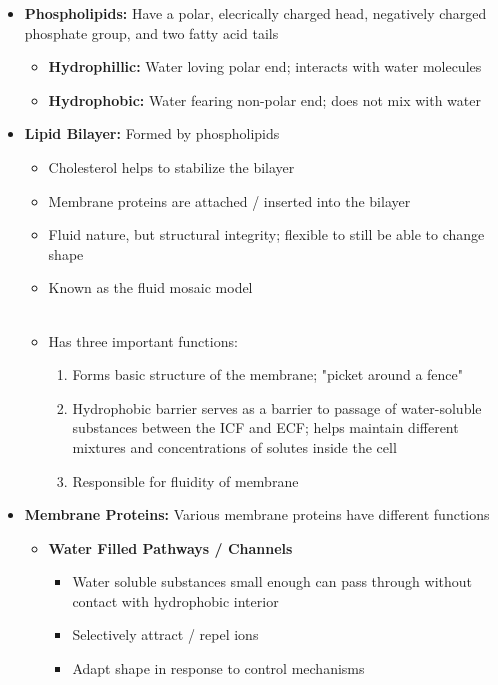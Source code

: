 \documentclass[11pt]{article}
\begin{document}
\begin{itemize}

\item \textbf{Phospholipids:} Have a polar, elecrically charged head, negatively charged phosphate group, and two fatty acid tails
\begin{itemize}
\item \textbf{Hydrophillic: }Water loving polar end; interacts with water molecules
\item \textbf{Hydrophobic: }Water fearing non-polar end; does not mix with water
\end{itemize}
\item \textbf{Lipid Bilayer:} Formed by phospholipids
\begin{itemize}
\item Cholesterol helps to stabilize the bilayer
\item Membrane proteins are attached / inserted into the bilayer
\item Fluid nature, but structural integrity; flexible to still be able to change shape
\item Known as the fluid mosaic model
\\ \\
\item Has three important functions:
\begin{enumerate}
\item Forms basic structure of the membrane; "picket around a fence"
\item Hydrophobic barrier serves as a barrier to passage of water-soluble substances between the ICF and ECF; helps maintain different mixtures and concentrations of solutes inside the cell
\item Responsible for fluidity of membrane
\end{enumerate}
\end{itemize}
\item \textbf{Membrane Proteins:} Various membrane proteins have different functions
\begin{itemize}
\item \textbf{Water Filled Pathways / Channels}
\begin{itemize}
\item Water soluble substances small enough can pass through without contact with hydrophobic interior
\item Selectively attract / repel ions
\item Adapt shape in response to control mechanisms
\end{itemize}

\end{itemize}
\end{itemize}
\end{document}
